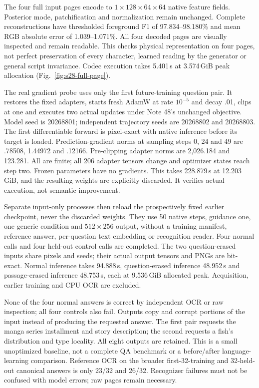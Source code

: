 \documentclass[10pt,a4paper]{article}
\begin{document}
The four full input pages encode to $1\times128\times64\times64$ native feature
fields. Posterior mode, patchification and normalization remain unchanged.
Complete reconstructions have thresholded foreground F1 of 97.834--98.180\%
and mean RGB absolute error of 1.039--1.071\%. All four decoded pages are
visually inspected and remain readable. This checks physical representation
on four pages, not perfect preservation of every character, learned reading
by the generator or general script invariance. Codec execution takes
5.401\,s at 3.574\,GiB peak allocation (Fig.~\ref{fig:s28-full-page}).

The real gradient probe uses only the first future-training question pair.
It restores the fixed adapters, starts fresh AdamW at rate $10^{-5}$ and decay
.01, clips at one and executes two actual updates under Note 48's unchanged
objective. Model seed is 20268801; independent trajectory seeds are 20268802
and 20268803. The first differentiable forward is pixel-exact with native
inference before its target is loaded. Prediction-gradient norms at sampling
steps 0, 24 and 49 are .78508, 1.44972 and .12166. Pre-clipping adapter norms
are 2,026.184 and 123.281. All are finite; all 206 adapter tensors change and
optimizer states reach step two. Frozen parameters have no gradients. This
takes 228.879\,s at 12.203\,GiB, and the resulting weights are explicitly
discarded. It verifies actual execution, not semantic improvement.

Separate input-only processes then reload the prospectively fixed earlier
checkpoint, never the discarded weights. They use 50 native steps, guidance
one, one generic condition and $512\times256$ output, without a training
manifest, reference answer, per-question text embedding or recognition reader.
Four normal calls and four held-out control calls are completed. The two
question-erased inputs share pixels and seeds; their actual output tensors
and PNGs are bit-exact. Normal inference takes 94.888\,s, question-erased
inference 48.952\,s and passage-erased inference 48.753\,s, each at
9.536\,GiB allocated peak. Acquisition, earlier training and CPU OCR are excluded.

None of the four normal answers is correct by independent OCR or raw inspection;
all four controls also fail. Outputs copy and corrupt portions of the input
instead of producing the requested answer. The first pair requests the manga
series installment and story description; the second requests a fish's
distribution and type locality. All eight outputs are retained. This is a
small unoptimized baseline, not a complete QA benchmark or a before/after
language-learning comparison. Reference OCR on the broader first-32-training
and 32-held-out canonical answers is only 23/32 and 26/32. Recognizer failures
must not be confused with model errors; raw pages remain necessary.
\end{document}
